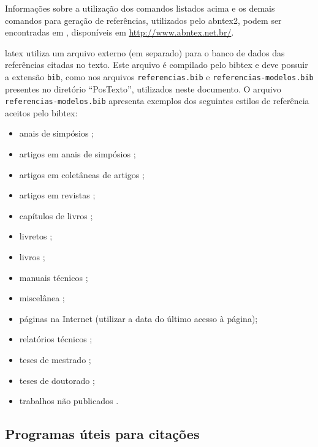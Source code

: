 Informações sobre a utilização dos comandos listados acima e os demais comandos para geração de referências, utilizados pelo \gls{abntex2}, podem ser encontradas em , disponíveis em \url{http://www.abntex.net.br/}.

\gls{latex} utiliza um arquivo externo (em separado) para o banco de dados das referências citadas no texto. Este arquivo é compilado pelo \gls{bibtex} e deve possuir a extensão \texttt{bib}, como nos arquivos \texttt{referencias.bib} e \texttt{referencias-modelos.bib} presentes no diretório ``PosTexto'', utilizados neste documento. O arquivo \texttt{referencias-modelos.bib} apresenta exemplos dos seguintes estilos de referência aceitos pelo \gls{bibtex}:

\begin{itemize}%
\item anais de simpósios \citep{Alt1995,Pirmez2002};
\item artigos em anais de simpósios \citep{Faina2001};
\item artigos em coletâneas de artigos \citep{Pinto2000};
\item artigos em revistas \citep{Guimaraes2003};
\item capítulos de livros \citep{Santos2000};
\item livretos \citep{Thompson2001};
\item livros \citep{Pedrycz1998};
\item manuais técnicos \citep{IONA1999};
\item miscelânea \citep{Cruz2003};
\item páginas na Internet \cite[acessado em 1 de janeiro de 2004]{Larsson2003} (utilizar a data do último acesso à página);
\item relatórios técnicos \citep{OMG2000};
\item teses de mestrado \citep{SantosFilho2003};
\item teses de doutorado \citep{Faina2000};
\item trabalhos não publicados \citep{Sichman2002}.
\end{itemize}

\subsection{Programas úteis para citações}\label{sec:progUteisCitacoes}

